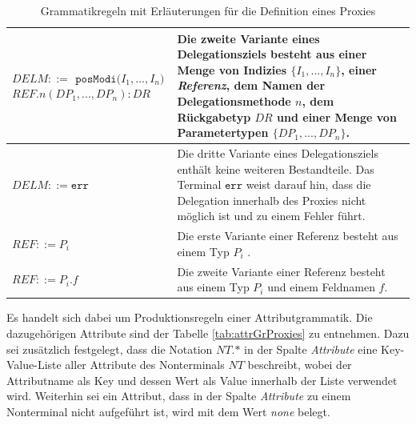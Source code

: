 \documentclass[a4paper,12pt]{article}
\begin{document}
\begin{table}[H]
\begin{tabular}{|p{5cm}|p{9cm}|}
\hline
$\mathit{DELM} ::=$\newline
$\texttt{posModi(} \mathit{I_1},...,\mathit{I_n} \texttt{)}$\newline
$\mathit{REF}.\mathit{n(\mathit{DP_1},...,\mathit{DP_n}):DR} $  
& Die zweite Variante eines Delegationsziels besteht aus einer Menge von Indizies $\{\mathit{I_1},...,\mathit{I_n}\}$, einer \emph{Referenz}, dem Namen der Delegationsmethode $n$, dem Rückgabetyp $\mathit{DR}$ und einer Menge von Parametertypen $\{\mathit{DP_1},...,\mathit{DP_n}\}$.\\
\hline
$\mathit{DELM} ::= \texttt{err} $  
& Die dritte Variante eines Delegationsziels enthält keine weiteren Bestandteile. Das Terminal $\texttt{err}$ weist darauf hin, dass die Delegation innerhalb des Proxies nicht möglich ist und zu einem Fehler führt.\\
\hline
$\mathit{REF} ::= \mathit{P_i}$
& Die erste Variante einer Referenz besteht aus einem Typ $P_i$ .\\
\hline
$\mathit{REF} ::= \mathit{P_i}\texttt{.}\mathit{f}$
& Die zweite Variante einer Referenz besteht aus einem Typ $P_i$ und einem Feldnamen $f$.\\
\hline
\end{tabular}
\caption{Grammatikregeln mit Erläuterungen für die Definition eines Proxies}
 \label{tab:grProxies}
\end{table}
\noindent
Es handelt sich dabei um Produktionsregeln einer Attributgrammatik. Die dazugehörigen Attribute sind der Tabelle \ref{tab:attrGrProxies} zu entnehmen. Dazu sei zusätzlich festgelegt, dass die Notation $\mathit{NT}\texttt{.}\text{*}$ in der Spalte \emph{Attribute} eine Key-Value-Liste aller Attribute des Nonterminals $\mathit{NT}$ beschreibt, wobei der Attributname als Key und dessen Wert als Value innerhalb der Liste verwendet wird. Weiterhin sei ein Attribut, dass in der Spalte \emph{Attribute} zu einem Nonterminal nicht aufgeführt ist, wird mit dem Wert \emph{none} belegt.
\end{document}
